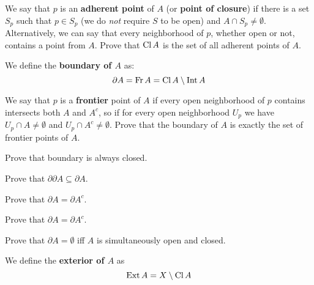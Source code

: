 \begin{prob}
	We say that $p$ is an \textbf{adherent point} of $A$
  (or \textbf{point of closure})
  if there is a set $S_p$ such that $p\in S_p$ (we do
  \textit{not} require $S$ to be open) and
  $A\cap S_p\neq \emptyset$. Alternatively, we can say that every
  neighborhood of $p$, whether open or not, contains
  a point from $A$. Prove that $\text{Cl\,} A$ is the set
	of all adherent points of $A$.
\end{prob}

\noindent We define the \textbf{boundary of $A$} as:
$$\partial A=\text{Fr\,} A = \text{Cl\,} A \setminus \text{Int\,} A$$

\begin{prob}
  We say that $p$ is a \textbf{frontier} point of $A$ if every open
  neighborhood of $p$ contains intersects both $A$ and $A^c$, so if
  for every open neighborhood $U_p$ we have
  $U_p\cap A\neq \emptyset$ and $U_p\cap A^c\neq \emptyset$.
  Prove that the boundary of $A$ is exactly the set of frontier
  points of $A$.
\end{prob}

\begin{prob}
  Prove that boundary is always closed.
\end{prob}

\begin{prob}
  Prove that $\partial \partial A \subseteq \partial A$.
\end{prob}

\begin{prob}
  Prove that $\partial A = \partial A^c.$
\end{prob}

\begin{prob}
  Prove that $\partial A = \partial A^c.$
\end{prob}

\begin{prob}
  Prove that $\partial A = \emptyset$ iff $A$ is simultaneously
  open and closed.
\end{prob}

We define the \textbf{exterior of $A$} as
$$\text{Ext\,} A = X\setminus \text{Cl\,} A$$
